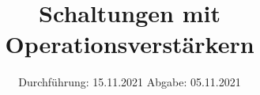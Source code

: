 
\setlength\parindent{0pt}
\subject{V51}
\title{Schaltungen mit Operationsverstärkern}
\date{%
  Durchführung: 15.11.2021
  \hspace{3em}
  Abgabe: 05.11.2021 \\
}



\maketitle
\thispagestyle{empty}
\tableofcontents
\newpage







\newpage
\nocite{*}
\printbibliography
\appendix


